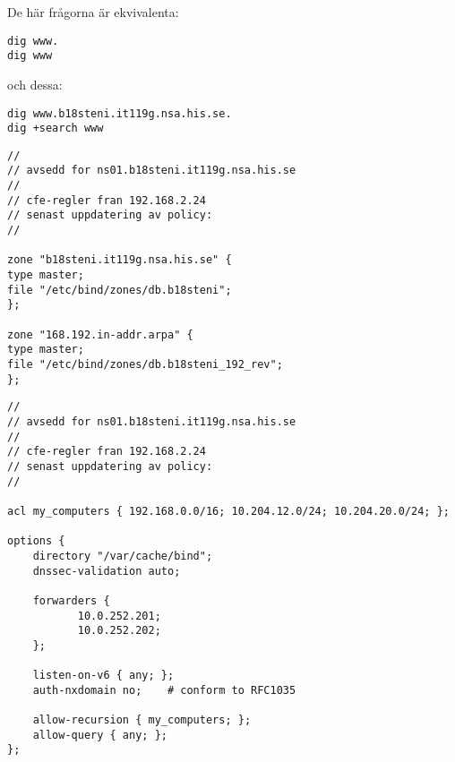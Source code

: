 \documentclass[11pt,a4paper]{article}
\begin{document}
De här frågorna är ekvivalenta:
\begin{verbatim}
dig www.
dig www
\end{verbatim}
och dessa:
\begin{verbatim}
dig www.b18steni.it119g.nsa.his.se.
dig +search www
\end{verbatim}

\begin{lstlisting}[caption={/etc/bind/named.conf.local}]
//
// avsedd for ns01.b18steni.it119g.nsa.his.se
//
// cfe-regler fran 192.168.2.24
// senast uppdatering av policy:
//

zone "b18steni.it119g.nsa.his.se" {
type master;
file "/etc/bind/zones/db.b18steni";
};

zone "168.192.in-addr.arpa" {
type master;
file "/etc/bind/zones/db.b18steni_192_rev";
};
\end{lstlisting}

\begin{lstlisting}[caption={/etc/bind/named.conf.options}]
//
// avsedd for ns01.b18steni.it119g.nsa.his.se
//
// cfe-regler fran 192.168.2.24
// senast uppdatering av policy:
//

acl my_computers { 192.168.0.0/16; 10.204.12.0/24; 10.204.20.0/24; };

options {
    directory "/var/cache/bind";
    dnssec-validation auto;

    forwarders {
           10.0.252.201;
           10.0.252.202;
    };

    listen-on-v6 { any; };
    auth-nxdomain no;    # conform to RFC1035

    allow-recursion { my_computers; };
    allow-query { any; };
};
\end{lstlisting}

\printbibliography{}
\end{document}
